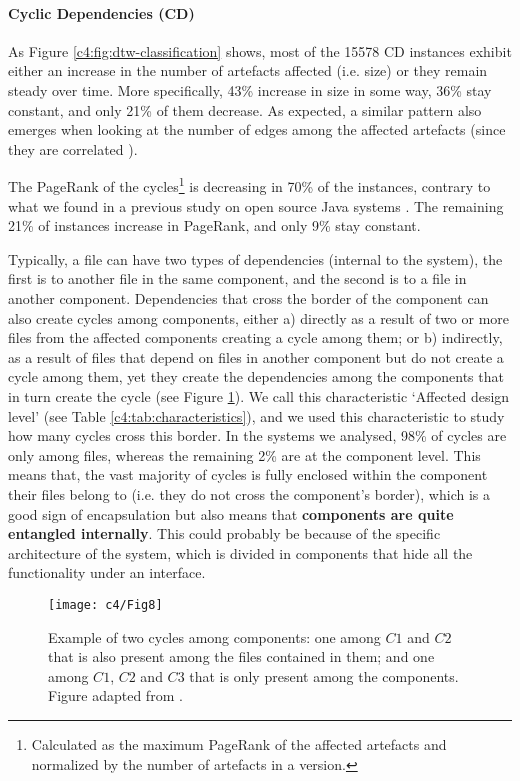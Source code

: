 \paragraph{Cyclic Dependencies (CD)} As Figure \ref{c4:fig:dtw-classification} shows, most of the 15578 CD instances exhibit either an increase in the number of artefacts affected (i.e. size) or they remain steady over time. More specifically, 43\% increase in size in some way, 36\% stay constant, and only 21\% of them decrease. As expected, a similar pattern also emerges when looking at the number of edges among the affected artefacts (since they are correlated \cite{Sas2019}).

The PageRank of the cycles\footnote{Calculated as the maximum PageRank of the affected artefacts and normalized by the number of artefacts in a version.} is decreasing in 70\% of the instances, contrary to what we found in a previous study on open source Java systems \cite{Sas2019}.
The remaining 21\% of instances increase in PageRank, and only 9\% stay constant.

Typically, a file can have two types of dependencies (internal to the system), the first is to another file in the same component, and the second is to a file in another component.
Dependencies that cross the border of the component can also create cycles among components, either a) directly as a result of two or more files from the affected components creating a cycle among them; or b) indirectly, as a result of files that depend on files in another component but do not create a cycle among them, yet they create the dependencies among the components that in turn create the cycle (see Figure \ref{c4:fig:package-cycles}). We call this characteristic `Affected design level' (see Table \ref{c4:tab:characteristics}), and we used this characteristic to study how many cycles cross this border.
In the systems we analysed, 98\% of cycles are only among files, whereas the remaining 2\% are at the component level.
This means that, the vast majority of cycles is fully enclosed within the component their files belong to (i.e. they do not cross the component's border), which is a good sign of encapsulation but also means that \textbf{components are quite entangled internally}.
This could probably be because of the specific architecture of the system, which is divided in components that hide all the functionality under an interface.

\begin{figure}
    \centering
    \texttt{[image: c4/Fig8]}
    \caption{Example of two cycles among components: one among $C1$ and $C2$ that is also present among the files contained in them; and one among $C1$, $C2$ and $C3$ that is only present among the components. Figure adapted from \cite{AlMutawa2014}.}
    \label{c4:fig:package-cycles}
\end{figure}

